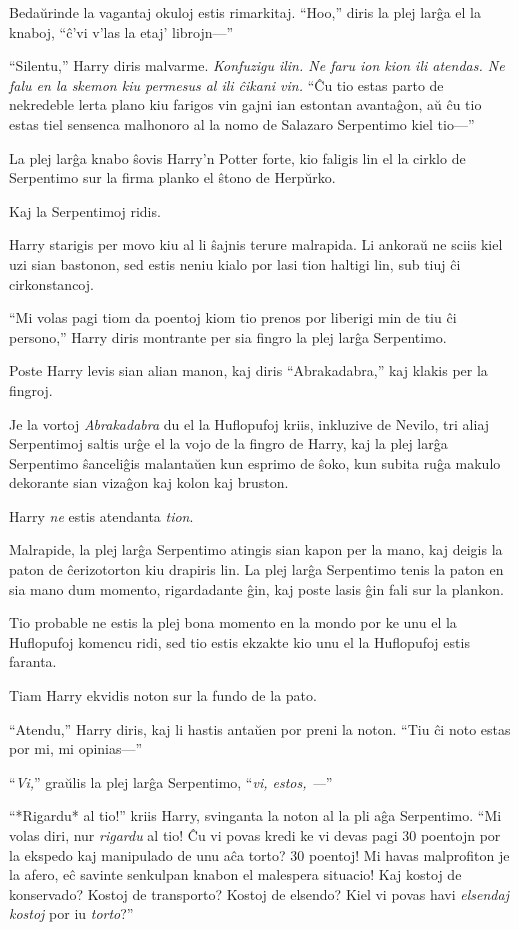 Bedaŭrinde la vagantaj okuloj estis rimarkitaj. ``Hoo,'' diris la plej
larĝa el la knaboj, ``ĉ'vi v'las la etaj' librojn—''

``Silentu,'' Harry diris malvarme. \emph{Konfuzigu ilin. Ne faru ion kion ili
atendas. Ne falu en la skemon kiu permesus al ili ĉikani vin.} ``Ĉu tio estas
parto de nekredeble lerta plano kiu farigos vin gajni ian estontan avantaĝon, aŭ
ĉu tio estas tiel sensenca malhonoro al la nomo de Salazaro Serpentimo kiel
tio—''

La plej larĝa knabo ŝovis Harry'n Potter forte, kio faligis lin el la cirklo de
Serpentimo sur la firma planko el ŝtono de Herpŭrko.

Kaj la Serpentimoj ridis.

Harry starigis per movo kiu al li ŝajnis terure malrapida. Li ankoraŭ ne sciis
kiel uzi sian bastonon, sed estis neniu kialo por lasi tion haltigi lin, sub
tiuj ĉi cirkonstancoj.

``Mi volas pagi tiom da poentoj kiom tio prenos por liberigi min de tiu ĉi
persono,'' Harry diris montrante per sia fingro la plej larĝa Serpentimo.

Poste Harry levis sian alian manon, kaj diris ``Abrakadabra,'' kaj
klakis per la fingroj.

Je la vortoj \emph{Abrakadabra} du el la Huflopufoj kriis, inkluzive de Nevilo,
tri aliaj Serpentimoj saltis urĝe el la vojo de la fingro de Harry, kaj la plej
larĝa Serpentimo ŝanceliĝis malantaŭen kun esprimo de ŝoko, kun subita ruĝa
makulo dekorante sian vizaĝon kaj kolon kaj bruston.

Harry \emph{ne} estis atendanta \emph{tion}.

Malrapide, la plej larĝa Serpentimo atingis sian kapon per la mano, kaj deigis
la paton de ĉerizotorton kiu drapiris lin. La plej larĝa Serpentimo tenis la
paton en sia mano dum momento, rigardadante ĝin, kaj poste lasis ĝin fali sur la
plankon.

Tio probable ne estis la plej bona momento en la mondo por ke unu el la
Huflopufoj komencu ridi, sed tio estis ekzakte kio unu el la Huflopufoj estis
faranta.

Tiam Harry ekvidis noton sur la fundo de la pato.

``Atendu,'' Harry diris, kaj li hastis antaŭen por preni la noton. ``Tiu ĉi noto
estas por mi, mi opinias—''

``\emph{Vi,}'' graŭlis la plej larĝa Serpentimo, ``\emph{vi, estos, —}''

``*Rigardu* al tio!'' kriis Harry, svinganta la noton al la pli aĝa Serpentimo.
``Mi volas diri, nur \emph{rigardu} al tio! Ĉu vi povas kredi ke vi devas pagi
30 poentojn por la ekspedo kaj manipulado de unu aĉa torto? 30 poentoj! Mi havas
malprofiton je la afero, eĉ savinte senkulpan knabon el malespera situacio!
Kaj kostoj de konservado? Kostoj de transporto? Kostoj de elsendo? Kiel vi povas
havi \emph{elsendaj kostoj} por iu \emph{torto}?''

